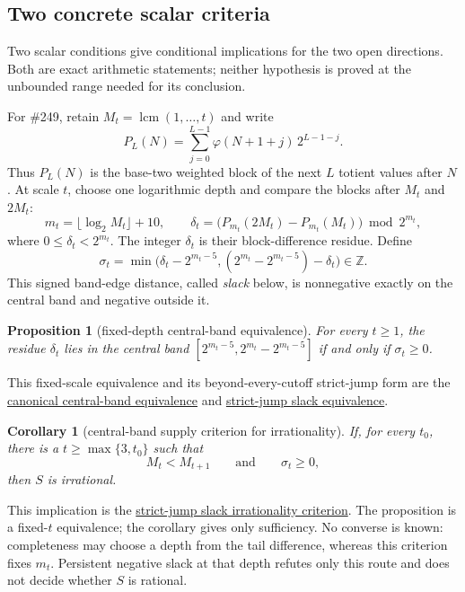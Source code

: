 \documentclass[11pt]{article}
\newcommand{\commit}{312b96c0d149ed466725c62d4ef24cfc91bca34e}
\newcommand{\repobase}{https://github.com/wcook04/plectis-lean-erdos249-257/blob/\commit}
\newcommand{\PK}{Erdos249257}
\newcommand{\lword}[4]{\href{\repobase/\PK/#1\#L#2}{#4}}
\newtheorem{proposition}[theorem]{Proposition}
\newtheorem{corollary}[theorem]{Corollary}
\theoremstyle{definition}
\theoremstyle{remark}
\newcommand{\Z}{\mathbb{Z}}
\newcommand{\ph}{\varphi}
\newcommand{\lcm}{\operatorname{lcm}}
\begin{document}
\subsection{Two concrete scalar criteria}

Two scalar conditions give conditional implications for the two open
directions.  Both are exact arithmetic statements; neither hypothesis is
proved at the unbounded range needed for its conclusion.

For \#249, retain $M_t=\lcm(1,\ldots,t)$ and write
\[
 P_L(N)=\sum_{j=0}^{L-1}\ph(N+1+j)\,2^{L-1-j}.
\]
Thus \(P_L(N)\) is the base-two weighted block of the next \(L\) totient
values after \(N\).  At scale \(t\), choose one logarithmic depth and compare
the blocks after \(M_t\) and \(2M_t\):
\[
 m_t=\lfloor\log_2 M_t\rfloor+10,\qquad
 \delta_t=\bigl(P_{m_t}(2M_t)-P_{m_t}(M_t)\bigr)\bmod 2^{m_t},
\]
where $0\le \delta_t<2^{m_t}$.  The integer \(\delta_t\) is their block-difference
residue.  Define
\[
  \sigma_t=\min\bigl(\delta_t-2^{m_t-5},
    (2^{m_t}-2^{m_t-5})-\delta_t\bigr)\in\Z.
\]
This signed band-edge distance, called \emph{slack} below, is nonnegative
exactly on the central band and negative outside it.

\begin{proposition}[fixed-depth central-band equivalence]\label{res:slackfrontier}
For every $t\ge1$, the residue \(\delta_t\) lies in the central band
$[2^{m_t-5},2^{m_t}-2^{m_t-5}]$ if and only if $\sigma_t\ge0$.
\end{proposition}
\noindent This fixed-scale equivalence and its beyond-every-cutoff strict-jump
form are the
\lword{DiagonalFreshLossBridge.lean}{2667}{canonicalAdjacentSuffixCentral_iff_slack_nonneg}{canonical central-band equivalence}
and
\lword{DiagonalFreshLossBridge.lean}{2757}{canonicalAdjacentSuffixJumpCentralSupply_iff_slackSupply}{strict-jump slack equivalence}.

\begin{corollary}[central-band supply criterion for irrationality]
\label{res:slackcriterion}
If, for every $t_0$, there is a $t\ge\max\{3,t_0\}$ such that
\[
 M_t<M_{t+1}\qquad\text{and}\qquad \sigma_t\ge0,
\]
then $S$ is irrational.
\end{corollary}
\noindent This implication is the
\lword{DiagonalFreshLossBridge.lean}{2929}{irrational_totientSeries_of_canonicalAdjacentSuffixJumpSlackSupply}{strict-jump slack irrationality criterion}.
The proposition is a fixed-\(t\) equivalence; the corollary gives only
sufficiency.  No converse is known: completeness may choose a depth from the
tail difference, whereas this criterion fixes \(m_t\).  Persistent negative
slack at that depth refutes only this route and does not decide whether \(S\)
is rational.
\end{document}
